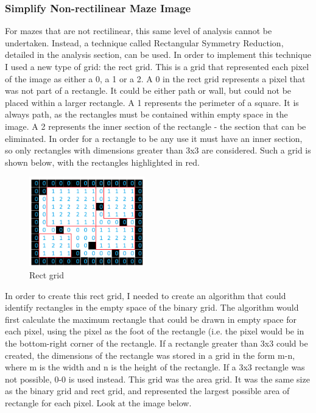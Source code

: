 \documentclass[titlepage]{article}
\begin{document}
\subsubsection{Simplify Non-rectilinear Maze Image}

For mazes that are not rectilinear, this same level of analysis cannot be undertaken. Instead, a technique called Rectangular Symmetry Reduction, detailed in the analysis section, can be used. In order to implement this technique I used a new type of grid: the rect grid. This is a grid that represented each pixel of the image as either a 0, a 1 or a 2. A 0 in the rect grid represents a pixel that was not part of a rectangle. It could be either path or wall, but could not be placed within a larger rectangle. A 1 represents the perimeter of a square. It is always path, as the rectangles must be contained within empty space in the image. A 2 represents the inner section of the rectangle - the section that can be eliminated. In order for a rectangle to be any use it must have an inner section, so only rectangles with dimensions greater than 3x3 are considered. Such a grid is shown below, with the rectangles highlighted in red. 

\begin{figure}[H]
  \centering
  \includegraphics[width=5cm]{rectgrid.png}
  \caption{Rect grid}
  \label{fig:dijk}
\end{figure}

In order to create this rect grid, I needed to create an algorithm that could identify rectangles in the empty space of the binary grid. The algorithm would first calculate the maximum rectangle that could be drawn in empty space for each pixel, using the pixel as the foot of the rectangle (i.e. the pixel would be in the bottom-right corner of the rectangle. If a rectangle greater than 3x3 could be created, the dimensions of the rectangle was stored in a grid in the form m-n, where m is the width and n is the height of the rectangle. If a 3x3 rectangle was not possible, 0-0 is used instead. This grid was the area grid. It was the same size as the binary grid and rect grid, and represented the largest possible area of rectangle for each pixel. Look at the image below.
\end{document}
